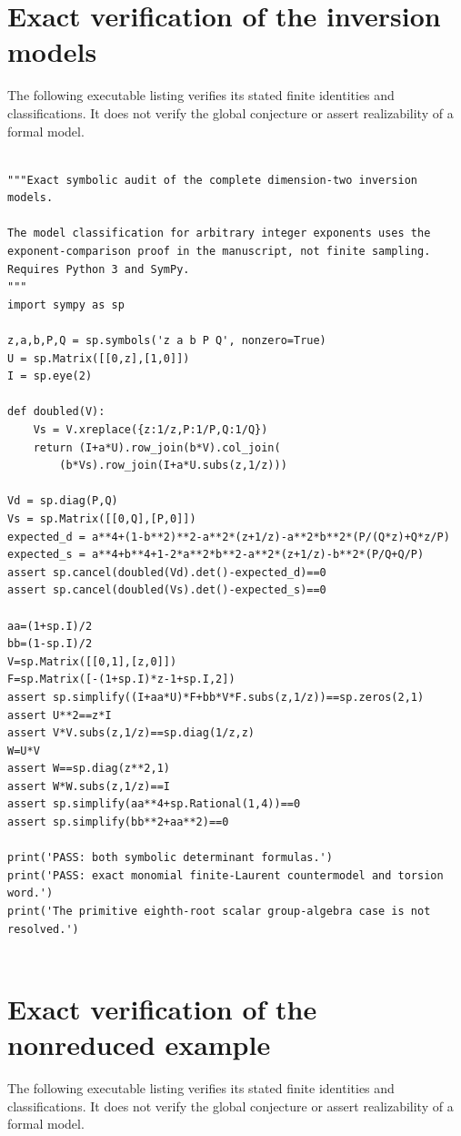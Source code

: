 \documentclass[11pt,a4paper,oneside]{report}
\theoremstyle{definition}
\theoremstyle{remark}
\begin{document}
\clearpage
\section{Exact verification of the inversion models}
The following executable listing verifies its stated finite
identities and classifications. It does not verify the global
conjecture or assert realizability of a formal model.

\begin{lstlisting}

"""Exact symbolic audit of the complete dimension-two inversion models.

The model classification for arbitrary integer exponents uses the
exponent-comparison proof in the manuscript, not finite sampling.
Requires Python 3 and SymPy.
"""
import sympy as sp

z,a,b,P,Q = sp.symbols('z a b P Q', nonzero=True)
U = sp.Matrix([[0,z],[1,0]])
I = sp.eye(2)

def doubled(V):
    Vs = V.xreplace({z:1/z,P:1/P,Q:1/Q})
    return (I+a*U).row_join(b*V).col_join(
        (b*Vs).row_join(I+a*U.subs(z,1/z)))

Vd = sp.diag(P,Q)
Vs = sp.Matrix([[0,Q],[P,0]])
expected_d = a**4+(1-b**2)**2-a**2*(z+1/z)-a**2*b**2*(P/(Q*z)+Q*z/P)
expected_s = a**4+b**4+1-2*a**2*b**2-a**2*(z+1/z)-b**2*(P/Q+Q/P)
assert sp.cancel(doubled(Vd).det()-expected_d)==0
assert sp.cancel(doubled(Vs).det()-expected_s)==0

aa=(1+sp.I)/2
bb=(1-sp.I)/2
V=sp.Matrix([[0,1],[z,0]])
F=sp.Matrix([-(1+sp.I)*z-1+sp.I,2])
assert sp.simplify((I+aa*U)*F+bb*V*F.subs(z,1/z))==sp.zeros(2,1)
assert U**2==z*I
assert V*V.subs(z,1/z)==sp.diag(1/z,z)
W=U*V
assert W==sp.diag(z**2,1)
assert W*W.subs(z,1/z)==I
assert sp.simplify(aa**4+sp.Rational(1,4))==0
assert sp.simplify(bb**2+aa**2)==0

print('PASS: both symbolic determinant formulas.')
print('PASS: exact monomial finite-Laurent countermodel and torsion word.')
print('The primitive eighth-root scalar group-algebra case is not resolved.')


\end{lstlisting}


\clearpage
\section{Exact verification of the nonreduced example}
The following executable listing verifies its stated finite
identities and classifications. It does not verify the global
conjecture or assert realizability of a formal model.
\end{document}

